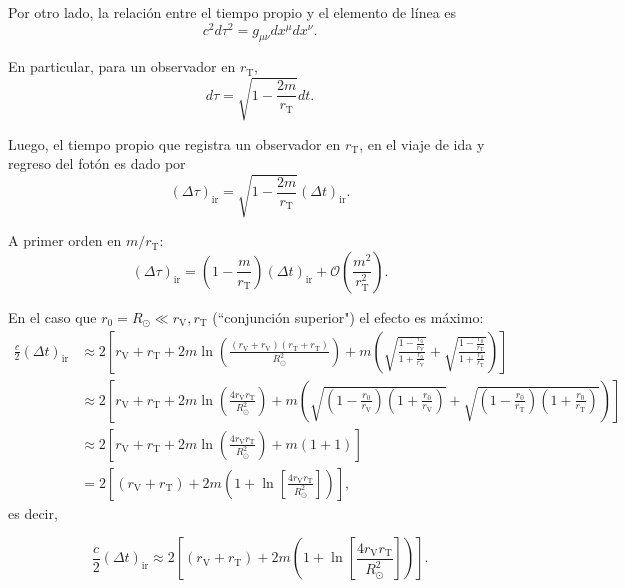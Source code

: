 \documentclass[letterpaper,11pt]{article}
\begin{document}
Por otro lado, la relación entre el tiempo propio y el elemento de línea es
\begin{equation}
c^2d\tau^2 = g_{\mu\nu} dx^{\mu} dx^{\nu}.
\end{equation}

En particular, para un observador en $r_{\text{T}}$, 
\begin{equation}
d\tau = \sqrt{1 - \frac{2m}{r_{\text{T}}}}  dt. 
\end{equation}


Luego, el tiempo propio que registra un observador en $r_{\text{T}}$, en el viaje de ida y regreso del fotón es dado por
\begin{equation}
(\Delta \tau)_{\text{ir}} = \sqrt{1 - \frac{2m}{r_{\text{T}}}} (\Delta t)_{\text{ir}}.
\end{equation}

A primer orden en $m/r_{\text{T}}$:
\begin{equation}
(\Delta \tau)_{\text{ir}} = \left(1 - \frac{m}{r_{\text{T}}} \right) (\Delta t)_{\text{ir}} + \mathcal{O}\left( \frac{m^2}{r_{\text{T}}^2}\right).
\end{equation}

En el caso que $r_0 = R_{\odot} \ll r_{\text{V}}, r_{\text{T}}$ (``conjunción superior") el efecto es máximo:
\begin{align}
\frac{c}{2} (\Delta t)_{\text{ir}} &\approx 2 \left[ r_{\text{V}} + r_{\text{T}}  +2m \ln\left( \frac{(r_{\text{V}} + r_{\text{V}})(r_{\text{T}} + r_{\text{T}})}{R_{\odot}^2}\right) + m \left( \sqrt{\frac{1 - \frac{r_0}{r_{\text{V}}}}{1 + \frac{r_0}{r_{\text{V}}}}} + \sqrt{\frac{1 - \frac{r_0}{r_{\text{T}}}}{1 + \frac{r_0}{r_{\text{T}}}}} \right)\right] \nonumber\\
&\approx 2 \left[ r_{\text{V}} + r_{\text{T}} + 2m \ln\left(\frac{4r_{\text{V}} r_{\text{T}}}{R_{\odot}^2}\right)+ m \left( \sqrt{\left(1 - \frac{r_0}{r_{\text{V}}}\right)\left(1 + \frac{r_0}{r_{\text{V}}}\right)} + \sqrt{\left(1 - \frac{r_0}{r_{\text{T}}}\right)\left(1 + \frac{r_0}{r_{\text{T}}}\right)}\right) \right] \nonumber\\
&\approx  2 \left[ r_{\text{V}} + r_{\text{T}} + 2m \ln\left(\frac{4r_{\text{V}} r_{\text{T}}}{R_{\odot}^2}\right)+ m(1 + 1) \right] \nonumber\\
&= 2 \left[(r_{\text{V}} + r_{\text{T}}) + 2m \left(1 + \ln\left[\frac{4r_{\text{V}} r_{\text{T}}}{R_{\odot}^2}\right]\right)\right], \label{eq:Shapiro-9}
\end{align}
es decir,
\begin{shaded}
\begin{equation}
\frac{c}{2} (\Delta t)_{\text{ir}} \approx 2 \left[(r_{\text{V}} + r_{\text{T}}) + 2m \left(1 + \ln\left[\frac{4r_{\text{V}} r_{\text{T}}}{R_{\odot}^2}\right]\right)\right].
\end{equation}
\end{shaded}
\end{document}
